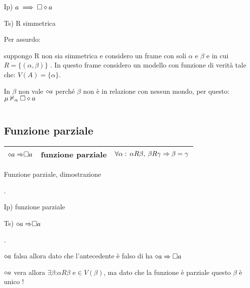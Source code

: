 Ip) $a\implies\square\diamond a$

Ts) R simmetrica

Per assurdo:

suppongo R non sia simmetrica e considero un frame con soli $\alpha$
e $\beta$ e in cui $R=\{(\alpha,\beta)\}$ . In questo frame considero
un modello con funzione di verità tale che: $V(A)=\{\alpha\}$.

In $\beta$ non vale $\diamond a$ perché $\beta$ non è in relazione con
nessun mondo, per questo: $\mu\nvDash_{\alpha}\square\diamond a$

\begin{center}
\begin{center}   \end{center}
\par\end{center}

$ $


\subsection{Funzione parziale}

\begin{tabular}{|c|c|c|}
\hline 
$\diamond{a\Rightarrow}\square a$  & funzione parziale  & $\forall\alpha:\,\alpha R\beta,\:\beta R\gamma\Rightarrow\beta=\gamma$\tabularnewline
\hline 
\end{tabular}

Funzione parziale, dimostrazione

.

Ip) funzione parziale

Ts) $\diamond{a\Rightarrow}\square a$

.

$\diamond a$ falsa allora dato che l'antecedente è falso di ha $\diamond a\Rightarrow\square a$

$\diamond a$ vera allora $\exists\beta$:$\alpha R\beta$ e$\in V(\beta)$,
ma dato che la funzione è parziale questo $\beta$ è unico !

